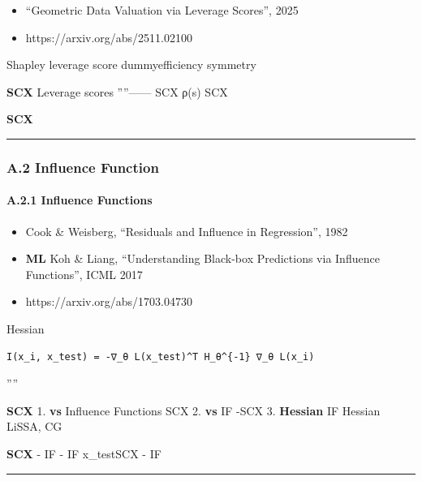 \documentclass[
  12pt,
]{article}
\providecommand{\tightlist}{%
  \setlength{\itemsep}{0pt}\setlength{\parskip}{0pt}}
\begin{document}
\begin{itemize}
\tightlist
\item
  \textbf{}``Geometric Data Valuation via Leverage Scores'', 2025
\item
  \textbf{}https://arxiv.org/abs/2511.02100
\end{itemize}

\textbf{} Shapley  leverage
score dummyefficiency  symmetry 

\textbf{ SCX }Leverage scores
''''------ SCX  ρ(s)
 SCX


\textbf{SCX
}

\begin{center}\rule{0.5\linewidth}{0.5pt}\end{center}

\subsubsection{A.2 Influence Function
}\label{a.2-influence-function-ux65b9ux6cd5}

\paragraph{A.2.1  Influence
Functions}\label{a.2.1-ux7ecfux5178-influence-functions}

\begin{itemize}
\tightlist
\item
  \textbf{}Cook \& Weisberg, ``Residuals and Influence in
  Regression'', 1982
\item
  \textbf{ML }Koh \& Liang, ``Understanding Black-box Predictions
  via Influence Functions'', ICML 2017
\item
  \textbf{}https://arxiv.org/abs/1703.04730
\end{itemize}

\textbf{} Hessian 

\begin{verbatim}
I(x_i, x_test) = -∇_θ L(x_test)^T H_θ^{-1} ∇_θ L(x_i)
\end{verbatim}

\textbf{}''''

\textbf{ SCX } 1. \textbf{ vs }Influence
Functions SCX 
2. \textbf{ vs }IF -SCX  3.
\textbf{Hessian }IF  Hessian LiSSA,
CG

\textbf{SCX } - IF  - IF
 x\_testSCX
 - IF


\begin{center}\rule{0.5\linewidth}{0.5pt}\end{center}
\end{document}
